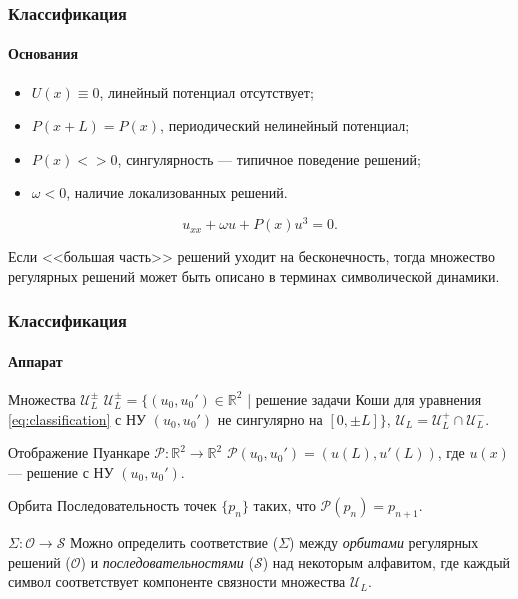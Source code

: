 \documentclass [10pt] {beamer}
\begin{document}
\begin{frame}
	\frametitle{Классификация}
	\framesubtitle{Основания}
	
	\begin{itemize}
		\item $U(x) \equiv 0$, линейный потенциал отсутствует;
		\item $P(x + L) = P(x)$, периодический нелинейный потенциал;
		\item $P(x) <> 0$, сингулярность --- типичное поведение решений;
		\item $\omega < 0$, наличие локализованных решений.
	\end{itemize}
	
	\begin{equation}
		u_{xx} + \omega u + P(x) u^3 = 0.
		\label{eq:classification}
	\end{equation}
	
	\medskip
	
	Если <<большая часть>> решений уходит на бесконечность, тогда множество регулярных решений может быть описано в терминах символической динамики\footnotemark[3].
	
\end{frame}

\begin{frame}
	\frametitle{Классификация}
	\framesubtitle{Аппарат}

	\begin{block}{Множества $\mathscr{U}_L^{\pm}$}
	$\mathscr{U}_L^{\pm} = \{ (u_0, u_0') \in \mathbb{R}^2$ | решение задачи Коши для уравнения \eqref{eq:classification} с НУ $(u_0, u_0')$ не сингулярно на $[0, {\pm} L] \}$, $\mathscr{U}_L = \mathscr{U}_L^+ \cap \mathscr{U}_L^-$.
	\end{block}

	\begin{block}{Отображение Пуанкаре $\mathcal{P}: \mathbb{R}^2 \to \mathbb{R}^2$}
		$\mathcal{P} (u_0,u_0') = (u(L), u'(L))$, где $u(x)$ --- решение с НУ $(u_0, u_0')$.
	\end{block}

	\begin{block}{Орбита}
		Последовательность точек $\{ p_n \}$ таких, что $\mathcal{P}(p_n) = p_{n+1}$.
	\end{block}

	\begin{block}{$\Sigma: \mathcal{O} \to \mathcal{S}$}
		Можно определить соответствие ($\Sigma$) между {\it орбитами} регулярных решений ($\mathcal{O}$) и {\it последовательностями} ($\mathcal{S}$) над некоторым алфавитом, где каждый символ соответствует компоненте связности множества $\mathscr{U}_L$.
	\end{block}
\end{frame}
\end{document}
